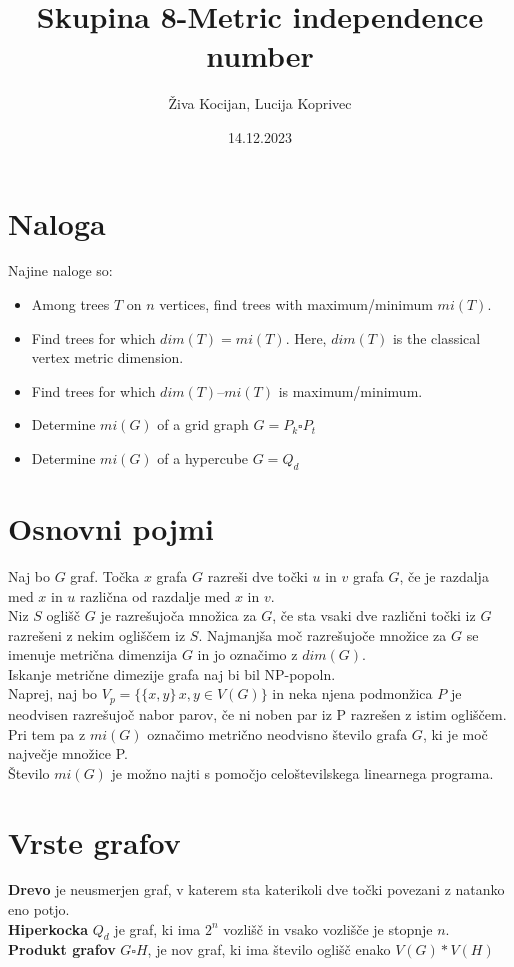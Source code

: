 \documentclass[a4paper]{article}
\title{Skupina 8-Metric independence number}
\author{Živa Kocijan, Lucija Koprivec}
\date{14.12.2023}
\begin{document}
\maketitle

\section{Naloga}
Najine naloge so:
\begin{itemize}
  \item Among trees $T$ on $n$ vertices, find trees with maximum/minimum $mi(T)$.
  \item Find trees for which $dim(T) = mi(T)$. Here, $dim(T)$ is the classical vertex metric dimension.
  \item Find trees for which $dim(T)\text{--} mi(T)$ is maximum/minimum.
  \item Determine $mi(G)$ of a grid graph $G = P_{k} \square P_{t}$
  \item Determine $mi(G)$ of a hypercube $G = Q_{d}$
\end{itemize}


\section{Osnovni pojmi}
Naj bo $G$ graf. Točka $x$ grafa $G$ razreši dve točki $u$ in $v$ grafa $G$, če je
razdalja med $x$ in $u$ različna od razdalje med $x$ in $v$.\\
Niz $S$ oglišč $G$ je razrešujoča množica za $G$, če sta vsaki dve različni točki
iz $G$ razrešeni z nekim ogliščem iz $S$. Najmanjša moč
razrešujoče množice za $G$ se imenuje metrična dimenzija $G$ in jo označimo z $dim(G)$. \\
Iskanje metrične dimezije grafa naj bi bil NP-popoln.\\
Naprej, naj bo $V_{p}=\{\{x,y\}\, x,y \in V(G)\}$ in neka njena podmonžica $P$ je neodvisen razrešujoč nabor parov, če ni noben par iz P razrešen z istim ogliščem. Pri tem pa z $mi(G)$ označimo metrično neodvisno število grafa $G$, ki je moč največje množice P. \\
Število $mi(G)$ je možno najti s pomočjo celoštevilskega linearnega programa.

\section{Vrste grafov}
\textbf{Drevo} je neusmerjen graf, v katerem sta katerikoli dve točki povezani z natanko eno potjo.\\
\textbf{Hiperkocka} $Q_{d}$ je graf, ki ima $2^{n}$ vozlišč in vsako vozlišče je stopnje $n$. \\
\textbf{Produkt grafov} $G\square H$, je nov graf, ki ima število oglišč enako $V(G)*V(H)$
\end{document}
